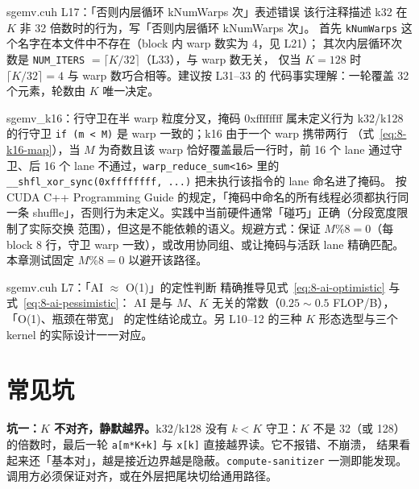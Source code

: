 \begin{kaogu}[F3]{sgemv.cuh L17：「否则内层循环 kNumWarps 次」表述错误}
  该行注释描述 k32 在 $K$ 非 32 倍数时的行为，写「否则内层循环 kNumWarps 次」。
  首先 \texttt{kNumWarps} 这个名字在本文件中不存在（block 内 warp 数实为 4，见 L21）；
  其次内层循环次数是 \texttt{NUM\_ITERS} $= \lceil K/32 \rceil$（L33），与 warp 数无关，
  仅当 $K = 128$ 时 $\lceil K/32 \rceil = 4$ 与 warp 数巧合相等。建议按 L31--33 的
  代码事实理解：一轮覆盖 32 个元素，轮数由 $K$ 唯一决定。
\end{kaogu}

\begin{kaogu}[F2]{sgemv\_k16：行守卫在半 warp 粒度分叉，掩码 0xffffffff 属未定义行为}
  k32/k128 的行守卫 \texttt{if (m < M)} 是 warp 一致的；k16 由于一个 warp 携带两行
  （式~\ref{eq:8-k16-map}），当 $M$ 为奇数且该 warp 恰好覆盖最后一行时，前 16 个 lane
  通过守卫、后 16 个 lane 不通过，\texttt{warp\_\allowbreak{}reduce\_\allowbreak{}sum\allowbreak{}<16>} 里的
  \texttt{\_\allowbreak{}\_\allowbreak{}shfl\_\allowbreak{}xor\_\allowbreak{}sync\allowbreak{}(0xffffffff,\allowbreak{} .\allowbreak{}.\allowbreak{}.\allowbreak{})} 把未执行该指令的 lane 命名进了掩码。
  按 CUDA C++ Programming Guide 的规定，「掩码中命名的所有线程必须都执行同一条
  shuffle」，否则行为未定义。实践中当前硬件通常「碰巧」正确（分段宽度限制了实际交换
  范围），但这是不能依赖的语义。规避方式：保证 $M \% 8 = 0$（每 block 8 行，守卫
  warp 一致），或改用协同组、或让掩码与活跃 lane 精确匹配。本章测试固定
  $M \% 8 = 0$ 以避开该路径。
\end{kaogu}

\begin{kaogu}[F3 核校通过]{sgemv.cuh L7：「AI $\approx$ O(1)」的定性判断}
  精确推导见式~\ref{eq:8-ai-optimistic} 与式~\ref{eq:8-ai-pessimistic}：
  AI 是与 $M$、$K$ 无关的常数（$0.25 \sim 0.5$ FLOP/B），「O(1)、瓶颈在带宽」
  的定性结论成立。另 L10--12 的三种 $K$ 形态选型与三个 kernel 的实际设计一一对应。
\end{kaogu}

\section{常见坑}

\textbf{坑一：$K$ 不对齐，静默越界。}\allowbreak{}k32/k128 没有 $k < K$ 守卫：$K$ 不是 32（或 128）
的倍数时，最后一轮 \texttt{a[m*K+k]} 与 \texttt{x[k]} 直接越界读。它不报错、不崩溃，
结果看起来还「基本对」，越是接近边界越是隐蔽。\texttt{compute-sanitizer} 一测即能发现。
调用方必须保证对齐，或在外层把尾块切给通用路径。

